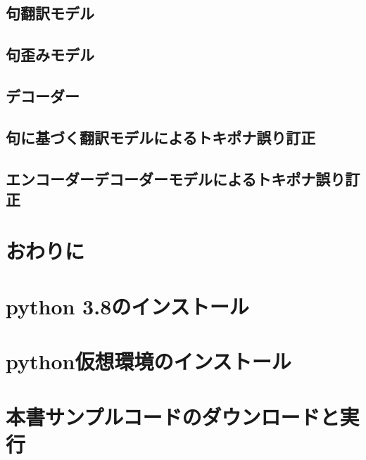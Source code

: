\documentclass[11pt]{report}
\begin{document}
\section{句翻訳モデル}

\section{句歪みモデル}

\section{デコーダー}

\section{句に基づく翻訳モデルによるトキポナ誤り訂正}

\section{エンコーダーデコーダーモデルによるトキポナ誤り訂正}

\chapter{おわりに}

\appendix
\def\thesection{補遺\Alph{section}}

\chapter{python 3.8のインストール}

\chapter{python仮想環境のインストール}

\chapter{本書サンプルコードのダウンロードと実行}
\end{document}
